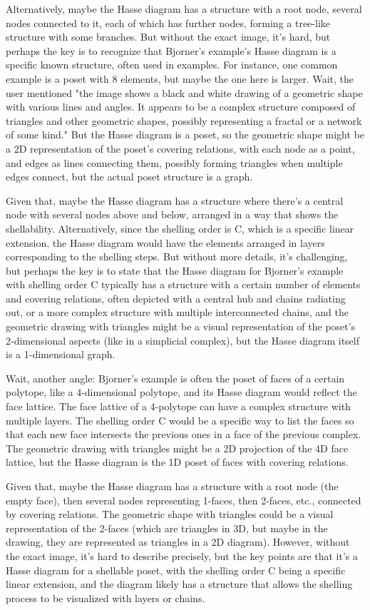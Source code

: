 Alternatively, maybe the Hasse diagram has a structure with a root node, several nodes connected to it, each of which has further nodes, forming a tree-like structure with some branches. But without the exact image, it's hard, but perhaps the key is to recognize that Bjorner's example's Hasse diagram is a specific known structure, often used in examples. For instance, one common example is a poset with 8 elements, but maybe the one here is larger. Wait, the user mentioned "the image shows a black and white drawing of a geometric shape with various lines and angles. It appears to be a complex structure composed of triangles and other geometric shapes, possibly representing a fractal or a network of some kind." But the Hasse diagram is a poset, so the geometric shape might be a 2D representation of the poset's covering relations, with each node as a point, and edges as lines connecting them, possibly forming triangles when multiple edges connect, but the actual poset structure is a graph.

Given that, maybe the Hasse diagram has a structure where there's a central node with several nodes above and below, arranged in a way that shows the shellability. Alternatively, since the shelling order is C, which is a specific linear extension, the Hasse diagram would have the elements arranged in layers corresponding to the shelling steps. But without more details, it's challenging, but perhaps the key is to state that the Hasse diagram for Bjorner's example with shelling order C typically has a structure with a certain number of elements and covering relations, often depicted with a central hub and chains radiating out, or a more complex structure with multiple interconnected chains, and the geometric drawing with triangles might be a visual representation of the poset's 2-dimensional aspects (like in a simplicial complex), but the Hasse diagram itself is a 1-dimensional graph.

Wait, another angle: Bjorner's example is often the poset of faces of a certain polytope, like a 4-dimensional polytope, and its Hasse diagram would reflect the face lattice. The face lattice of a 4-polytope can have a complex structure with multiple layers. The shelling order C would be a specific way to list the faces so that each new face intersects the previous ones in a face of the previous complex. The geometric drawing with triangles might be a 2D projection of the 4D face lattice, but the Hasse diagram is the 1D poset of faces with covering relations.

Given that, maybe the Hasse diagram has a structure with a root node (the empty face), then several nodes representing 1-faces, then 2-faces, etc., connected by covering relations. The geometric shape with triangles could be a visual representation of the 2-faces (which are triangles in 3D, but maybe in the drawing, they are represented as triangles in a 2D diagram). However, without the exact image, it's hard to describe precisely, but the key points are that it's a Hasse diagram for a shellable poset, with the shelling order C being a specific linear extension, and the diagram likely has a structure that allows the shelling process to be visualized with layers or chains.

